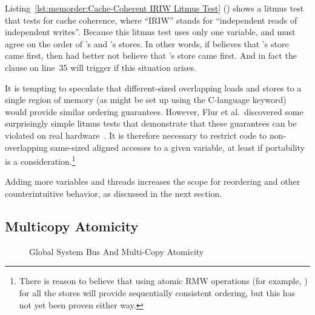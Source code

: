 Listing~\ref{lst:memorder:Cache-Coherent IRIW Litmus Test}
()
shows a litmus test that tests for cache coherence,
where ``IRIW'' stands
for ``independent reads of independent writes''.
Because this litmus test uses only one variable,
 and  must agree
on the order of 's and 's stores.
In other words, if  believes that 's store
came first, then  had better not believe that
's store came first.
And in fact the  clause on line~35 will trigger if this
situation arises.

It is tempting to speculate that different-sized overlapping loads
and stores to a single region of memory (as might be set up using
the C-language  keyword) would provide similar ordering
guarantees.
However, Flur et al.~discovered some surprisingly simple
litmus tests that demonstrate that these guarantees can be violated on
real hardware~\cite{Flur:2017:MCA:3093333.3009839}.
It is therefore necessary to restrict code to non-overlapping
same-sized aligned accesses to a given variable, at least if portability
is a consideration.\footnote{
	There is reason to believe that using atomic RMW operations
	(for example, ) for all the stores will
	provide sequentially consistent ordering, but this has not
	yet been proven either way.}

Adding more variables and threads increases the scope for reordering
and other counterintuitive behavior, as discussed in the next section.

\subsection{Multicopy Atomicity}
\label{sec:memorder:Multicopy Atomicity}

\begin{figure}[tb]
\centering
{}
\caption{Global System Bus And Multi-Copy Atomicity}
\label{fig:memorder:Global System Bus And Multi-Copy Atomicity}
\end{figure}

